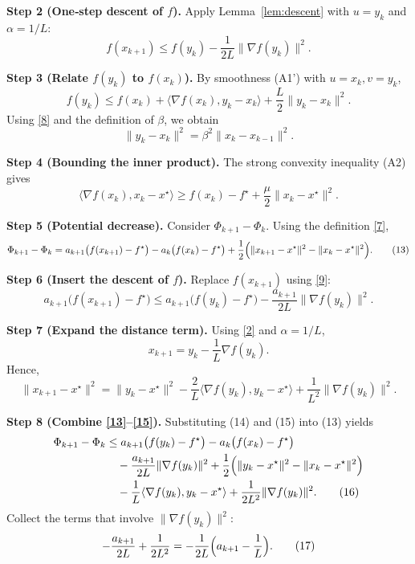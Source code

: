 \documentclass{article}
\begin{document}
\noindent\textbf{Step 2 (One‑step descent of $f$).} Apply Lemma~\ref{lem:descent} with $u=y_{k}$ and $\alpha=1/L$:
\[
f(x_{k+1})\le f(y_{k})-\frac{1}{2L}\|\nabla f(y_{k})\|^{2}. \tag{9}
\]

\noindent\textbf{Step 3 (Relate $f(y_{k})$ to $f(x_{k})$).} By smoothness (A1') with $u=x_{k},v=y_{k}$,
\[
f(y_{k})\le f(x_{k})+\langle\nabla f(x_{k}),y_{k}-x_{k}\rangle
+\frac{L}{2}\|y_{k}-x_{k}\|^{2}. \tag{10}
\]
Using \eqref{8} and the definition of $\beta$, we obtain
\[
\|y_{k}-x_{k}\|^{2}=\beta^{2}\|x_{k}-x_{k-1}\|^{2}. \tag{11}
\]

\noindent\textbf{Step 4 (Bounding the inner product).} The strong convexity inequality (A2) gives
\[
\langle\nabla f(x_{k}),x_{k}-x^{\star}\rangle
\ge f(x_{k})-f^{\star}+\frac{\mu}{2}\|x_{k}-x^{\star}\|^{2}. \tag{12}
\]

\noindent\textbf{Step 5 (Potential decrease).} Consider $\Phi_{k+1}-\Phi_{k}$. Using the definition \eqref{7},
\[
\Phi_{k+1}-\Phi_{k}
= a_{k+1}\bigl(f(x_{k+1})-f^{\star}\bigr)-a_{k}\bigl(f(x_{k})-f^{\star}\bigr)
+\frac12\Bigl(\|x_{k+1}-x^{\star}\|^{2}-\|x_{k}-x^{\star}\|^{2}\Bigr). \tag{13}
\]

\noindent\textbf{Step 6 (Insert the descent of $f$).} Replace $f(x_{k+1})$ using \eqref{9}:
\[
a_{k+1}\bigl(f(x_{k+1})-f^{\star}\bigr)
\le a_{k+1}\bigl(f(y_{k})-f^{\star}\bigr)-\frac{a_{k+1}}{2L}\|\nabla f(y_{k})\|^{2}. \tag{14}
\]

\noindent\textbf{Step 7 (Expand the distance term).} Using \eqref{2} and $\alpha=1/L$,
\[
x_{k+1}=y_{k}-\frac{1}{L}\nabla f(y_{k}) .
\]
Hence,
\[
\|x_{k+1}-x^{\star}\|^{2}
= \|y_{k}-x^{\star}\|^{2}
-\frac{2}{L}\langle\nabla f(y_{k}),y_{k}-x^{\star}\rangle
+\frac{1}{L^{2}}\|\nabla f(y_{k})\|^{2}. \tag{15}
\]

\noindent\textbf{Step 8 (Combine \eqref{13}–\eqref{15}).} Substituting (14) and (15) into (13) yields
\begin{align}
\Phi_{k+1}-\Phi_{k}
&\le a_{k+1}\bigl(f(y_{k})-f^{\star}\bigr)-a_{k}\bigl(f(x_{k})-f^{\star}\bigr) \nonumber\\
&\quad -\frac{a_{k+1}}{2L}\|\nabla f(y_{k})\|^{2}
+\frac12\Bigl(\|y_{k}-x^{\star}\|^{2}-\|x_{k}-x^{\star}\|^{2}\Bigr) \nonumber\\
&\quad -\frac{1}{L}\langle\nabla f(y_{k}),y_{k}-x^{\star}\rangle
+\frac{1}{2L^{2}}\|\nabla f(y_{k})\|^{2}. \tag{16}
\end{align}
Collect the terms that involve $\|\nabla f(y_{k})\|^{2}$:
\[
-\frac{a_{k+1}}{2L}+\frac{1}{2L^{2}}
= -\frac{1}{2L}\Bigl(a_{k+1}-\frac{1}{L}\Bigr). \tag{17}
\]
\end{document}
